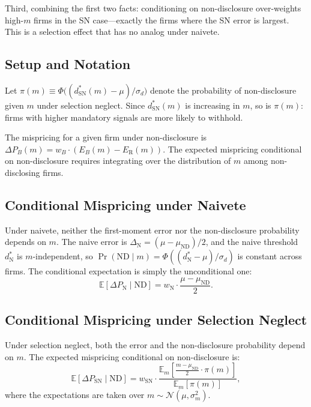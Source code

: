 \documentclass[12pt]{article}
\theoremstyle{plain}
\theoremstyle{definition}
\newcommand{\E}{\mathbb{E}}
\newcommand{\ND}{\mathrm{ND}}
\newcommand{\R}{\mathrm{R}}
\newcommand{\SN}{\mathrm{SN}}
\newcommand{\N}{\mathrm{N}}
\begin{document}
Third, combining the first two facts: conditioning on non-disclosure over-weights high-$m$ firms in the SN case---exactly the firms where the SN error is largest. This is a selection effect that has no analog under naivete.

\subsection{Setup and Notation}

Let $\pi(m) \equiv \Phi\bigl((d^*_\SN(m) - \mu)/\sigma_d\bigr)$ denote the probability of non-disclosure given $m$ under selection neglect. Since $d^*_\SN(m)$ is increasing in $m$, so is $\pi(m)$: firms with higher mandatory signals are more likely to withhold.

The mispricing for a given firm under non-disclosure is $\Delta P_B(m) = w_B \cdot (E_B(m) - E_\R(m))$. The expected mispricing conditional on non-disclosure requires integrating over the distribution of $m$ among non-disclosing firms.

\subsection{Conditional Mispricing under Naivete}

Under naivete, neither the first-moment error nor the non-disclosure probability depends on $m$. The naive error is $\Delta_\N = (\mu - \mu_\ND)/2$, and the naive threshold $d^*_\N$ is $m$-independent, so $\Pr(\ND \mid m) = \Phi((d^*_\N - \mu)/\sigma_d)$ is constant across firms. The conditional expectation is simply the unconditional one:
\begin{equation}
\E[\Delta P_\N \mid \ND] = w_\N \cdot \frac{\mu - \mu_\ND}{2}.
\label{eq:cond_naive}
\end{equation}

\subsection{Conditional Mispricing under Selection Neglect}

Under selection neglect, both the error and the non-disclosure probability depend on $m$. The expected mispricing conditional on non-disclosure is:
\begin{equation}
\E[\Delta P_\SN \mid \ND] = w_\SN \cdot \frac{\E_m\!\left[\frac{m - \mu_\ND}{2} \cdot \pi(m)\right]}{\E_m[\pi(m)]},
\label{eq:cond_sn}
\end{equation}
where the expectations are taken over $m \sim \mathcal{N}(\mu, \sigma_m^2)$.
\end{document}
